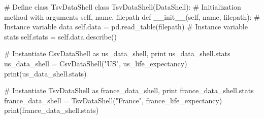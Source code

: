 # Define class TsvDataShell
class TsvDataShell(DataShell):
    # Initialization method with arguments self, name, filepath
    def __init__(self, name, filepath):
        # Instance variable data
        self.data = pd.read_table(filepath)
        # Instance variable stats
        self.stats = self.data.describe()

# Instantiate CsvDataShell as us_data_shell, print us_data_shell.stats
us_data_shell = CsvDataShell("US", us_life_expectancy)
print(us_data_shell.stats)

# Instantiate TsvDataShell as france_data_shell, print france_data_shell.stats
france_data_shell = TsvDataShell("France", france_life_expectancy)
print(france_data_shell.stats)


